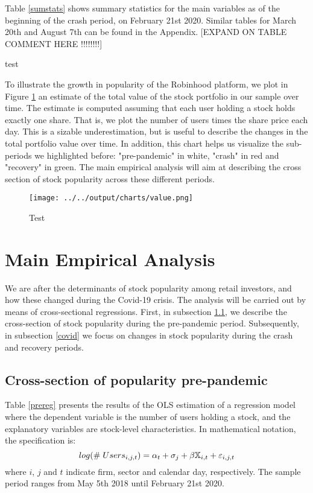 \documentclass[12pt]{article}
\numberwithin{equation}{section} %
\begin{document}
Table \ref{sumstats} shows summary statistics for the main variables as of the beginning of the crash period, on February 21st 2020. Similar tables for March 20th and August 7th can be found in the Appendix. [EXPAND ON TABLE COMMENT HERE !!!!!!!!]

\begin{table}
\centering
\caption{test} \label{sumstats}
 
\end{table}



To illustrate the growth in popularity of the Robinhood platform, we plot in Figure \ref{linevalue} an estimate of the total value of the stock portfolio in our sample over time. The estimate is computed assuming that each user holding a stock holds exactly one share. That is, we plot the number of users times the share price each day. This is a sizable underestimation, but is useful to describe the changes in the total portfolio value over time. In addition, this chart helps us visualize the sub-periods we highlighted before: "pre-pandemic" in white, "crash" in red and "recovery" in green. The main empirical analysis will aim at describing the cross section of stock popularity across these different periods.

\begin{figure}[h!]
\caption{Test}
\centering \label{linevalue}
\texttt{[image: ../../output/charts/value.png]}
\end{figure}


\section{Main Empirical Analysis}

We are after the determinants of stock popularity among retail investors, and how these changed during the Covid-19 crisis. The analysis will be carried out by means of cross-sectional regressions. First, in subsection \ref{pre}, we describe the cross-section of stock popularity during the pre-pandemic period. Subsequently, in subsection \ref{covid} we focus on changes in stock popularity during the crash and recovery periods.

\subsection{Cross-section of popularity pre-pandemic} \label{pre}

Table \ref{prereg} presents the results of the OLS estimation of a regression model where the dependent variable is the number of users holding a stock, and the explanatory variables are stock-level characteristics. In mathematical notation, the specification is:
$$
log(\# \hspace{1mm} Users_{i,j,t}) = \alpha_t + \sigma_j + \beta \mathbb{X}_{i,t} + \varepsilon_{i,j,t}
$$
where $i$, $j$ and $t$ indicate firm, sector and calendar day, respectively. The sample period ranges from May 5th 2018 until February 21st 2020.
\end{document}

